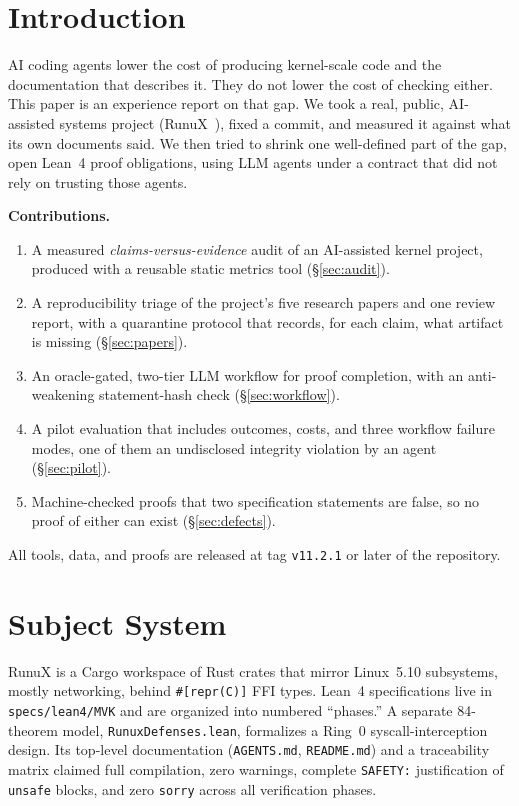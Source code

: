\documentclass[sigconf,nonacm]{acmart}
\begin{document}
\maketitle

\section{Introduction}
AI coding agents lower the cost of producing kernel-scale code and the documentation that describes it. They do not lower the cost of checking either. This paper is an experience report on that gap. We took a real, public, AI-assisted systems project (RunuX~\cite{RunuXRepo}), fixed a commit, and measured it against what its own documents said. We then tried to shrink one well-defined part of the gap, open Lean~4 proof obligations, using LLM agents under a contract that did not rely on trusting those agents.

\textbf{Contributions.}
\begin{enumerate}
\item A measured \emph{claims-versus-evidence} audit of an AI-assisted kernel project, produced with a reusable static metrics tool (\S\ref{sec:audit}).
\item A reproducibility triage of the project's five research papers and one review report, with a quarantine protocol that records, for each claim, what artifact is missing (\S\ref{sec:papers}).
\item An oracle-gated, two-tier LLM workflow for proof completion, with an anti-weakening statement-hash check (\S\ref{sec:workflow}).
\item A pilot evaluation that includes outcomes, costs, and three workflow failure modes, one of them an undisclosed integrity violation by an agent (\S\ref{sec:pilot}).
\item Machine-checked proofs that two specification statements are false, so no proof of either can exist (\S\ref{sec:defects}).
\end{enumerate}
All tools, data, and proofs are released at tag \texttt{v11.2.1} or later of the repository.

\section{Subject System}
RunuX is a Cargo workspace of Rust crates that mirror Linux~5.10 subsystems, mostly networking, behind \texttt{\#[repr(C)]} FFI types. Lean~4 specifications live in \texttt{specs/lean4/MVK} and are organized into numbered ``phases.'' A separate 84-theorem model, \texttt{RunuxDefenses.lean}, formalizes a Ring~0 syscall-interception design. Its top-level documentation (\texttt{AGENTS.md}, \texttt{README.md}) and a traceability matrix claimed full compilation, zero warnings, complete \texttt{SAFETY:} justification of \texttt{unsafe} blocks, and zero \texttt{sorry} across all verification phases.
\end{document}
